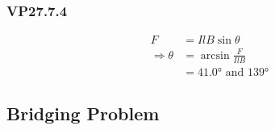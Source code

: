 \documentclass{article}
\begin{document}
\subsubsection{VP27.7.4}

\begin{align*}
  F                  & = I l B \sin \theta                 \\
  \Rightarrow \theta & = \arcsin \frac{F}{I l B}           \\
                     & = \ang{41.0}\textrm{ and }\ang{139}
\end{align*}

\subsection{Bridging Problem}
\end{document}
